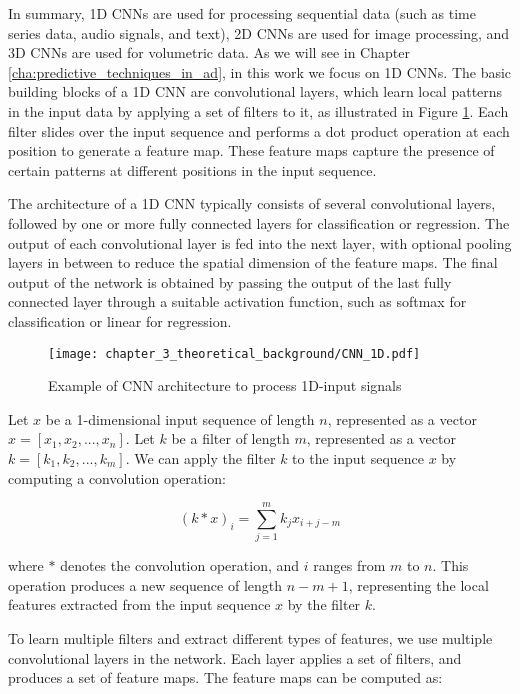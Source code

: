 In summary, 1D CNNs are used for processing sequential data (such as time series data, audio signals, and text), 2D CNNs are used for image processing, and 3D CNNs are used for volumetric data. As we will see in Chapter \ref{cha:predictive_techniques_in_ad}, in this work we focus on 1D CNNs. The basic building blocks of a 1D CNN are convolutional layers, which learn local patterns in the input data by applying a set of filters to it, as illustrated in Figure \ref{fig:chapter_3_theoretical_background/CNN_1D}. Each filter slides over the input sequence and performs a dot product operation at each position to generate a feature map. These feature maps capture the presence of certain patterns at different positions in the input sequence. 
 
The architecture of a 1D CNN typically consists of several convolutional layers, followed by one or more fully connected layers for classification or regression. The output of each convolutional layer is fed into the next layer, with optional pooling layers in between to reduce the spatial dimension of the feature maps. The final output of the network is obtained by passing the output of the last fully connected layer through a suitable activation function, such as softmax for classification or linear for regression.
 
 \begin{figure}[h]
 	\centering
 	\texttt{[image: chapter\_3\_theoretical\_background/CNN\_1D.pdf]}
 	\caption{Example of CNN architecture to process 1D-input signals}
 	\label{fig:chapter_3_theoretical_background/CNN_1D}
 \end{figure}
 
Let $x$ be a 1-dimensional input sequence of length $n$, represented as a vector $x = [x_1, x_2, ..., x_n]$. Let $k$ be a filter of length $m$, represented as a vector $k = [k_1, k_2, ..., k_m]$. We can apply the filter $k$ to the input sequence $x$ by computing a convolution operation:

\begin{equation}
	(k * x)_i = \sum_{j=1}^m k_j x_{i+j-m}
\end{equation}

where $*$ denotes the convolution operation, and $i$ ranges from $m$ to $n$. This operation produces a new sequence of length $n - m + 1$, representing the local features extracted from the input sequence $x$ by the filter $k$.

To learn multiple filters and extract different types of features, we use multiple convolutional layers in the network. Each layer applies a set of filters, and produces a set of feature maps. The feature maps can be computed as:

